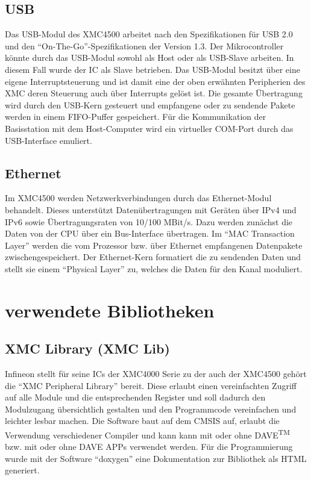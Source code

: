 \subsection{USB}
Das \ac{USB}-Modul des XMC4500 arbeitet nach den  Spezifikationen für USB 2.0 und den \enquote{On-The-Go}-Spezifikationen der Version 1.3. Der Mikrocontroller könnte durch das \ac{USB}-Modul sowohl als Host oder als USB-Slave  arbeiten. In diesem Fall wurde der \ac{IC} als Slave betrieben. Das \ac{USB}-Modul besitzt über eine eigene Interruptsteuerung und ist damit eine der oben erwähnten Peripherien des XMC deren Steuerung auch über Interrupts gelöst ist. Die gesamte Übertragung wird durch den \ac{USB}-Kern gesteuert und empfangene oder zu sendende Pakete werden in einem \ac{FIFO}-Puffer gespeichert. Für die Kommunikation der Basisstation mit dem Host-Computer wird ein virtueller COM-Port durch das \ac{USB}-Interface emuliert.

\subsection{Ethernet} 
Im XMC4500 werden Netzwerkverbindungen durch das  Ethernet-Modul behandelt. Dieses unterstützt Datenübertragungen mit Geräten über IPv4 und IPv6 sowie Übertragungsraten von 10/100 MBit/s.  Dazu werden zunächst die Daten von der CPU über ein Bus-Interface übertragen. Im \enquote{MAC Transaction Layer} werden die vom Prozessor bzw. über Ethernet empfangenen Datenpakete zwischengespeichert. Der Ethernet-Kern formatiert die zu sendenden Daten und stellt sie einem \enquote{Physical Layer} zu, welches die Daten für den Kanal moduliert.






\section{verwendete Bibliotheken}
\subsection{XMC Library (XMC Lib)}
Infineon stellt für seine \acp{IC} der XMC4000 Serie zu der auch der XMC4500 gehört die \enquote{XMC Peripheral Library} bereit. Diese erlaubt einen vereinfachten Zugriff auf alle Module und die entsprechenden Register und soll dadurch den Modulzugang übersichtlich gestalten und den Programmcode vereinfachen und leichter lesbar machen. Die Software baut auf dem \ac{CMSIS} auf, erlaubt die Verwendung verschiedener Compiler und kann kann mit oder ohne DAVE\textsuperscript{TM} bzw. mit oder ohne DAVE APPs verwendet werden. %
Für die Programmierung wurde mit der Software \enquote{doxygen} eine Dokumentation zur Bibliothek als HTML generiert.

